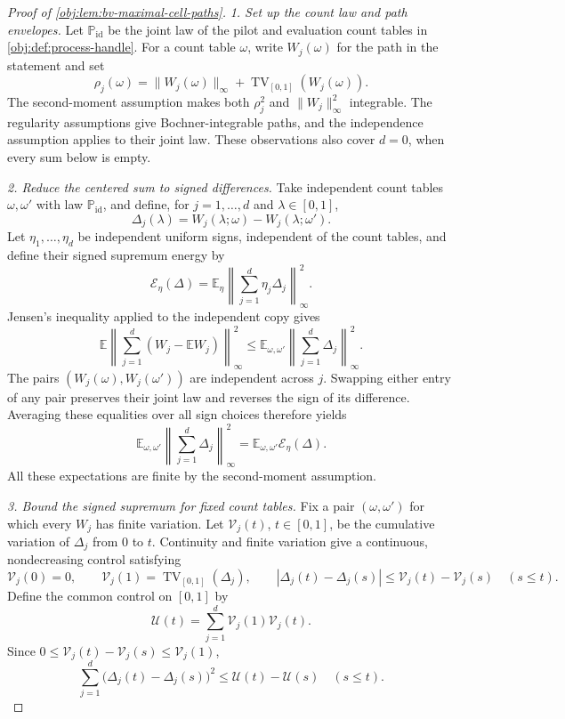 \begin{proof}[Proof of \cref{obj:lem:bv-maximal-cell-paths}]
\noindent\textit{1. Set up the count law and path envelopes.}
Let \(\mathbb P_{\mathrm{id}}\) be the joint law of the pilot and evaluation count tables in \cref{obj:def:process-handle}. For a count table \(\omega\), write \(W_j(\omega)\) for the path in the statement and set
\[
\rho_j(\omega)
=\|W_j(\omega)\|_\infty+
  \operatorname{TV}_{[0,1]}(W_j(\omega)).
\]
The second-moment assumption makes both \(\rho_j^2\) and
\(\|W_j\|_\infty^2\) integrable. The regularity assumptions give
Bochner-integrable paths, and the independence assumption applies to their
joint law. These observations also cover \(d=0\), when every sum below is
empty. %

\noindent\textit{2. Reduce the centered sum to signed differences.}
Take independent count tables \(\omega,\omega'\) with law
\(\mathbb P_{\mathrm{id}}\), and define, for \(j=1,\ldots,d\) and
\(\lambda\in[0,1]\),
\[
\Delta_j(\lambda)
=W_j(\lambda;\omega)-W_j(\lambda;\omega').
\]
Let \(\eta_1,\ldots,\eta_d\) be independent uniform signs, independent of
the count tables, and define their signed supremum energy by
\[
\mathcal E_\eta(\Delta)
=\mathbb E_\eta\left\|
  \sum_{j=1}^d\eta_j\Delta_j
 \right\|_\infty^2.
\]
Jensen's inequality applied to the independent copy gives
\[
\mathbb E\left\|
 \sum_{j=1}^d(W_j-\mathbb EW_j)
 \right\|_\infty^2
\le
\mathbb E_{\omega,\omega'}\left\|
 \sum_{j=1}^d\Delta_j
 \right\|_\infty^2.
\]
The pairs \((W_j(\omega),W_j(\omega'))\) are independent across \(j\).
Swapping either entry of any pair preserves their joint law and reverses
the sign of its difference. Averaging these equalities over all sign
choices therefore yields
\[
\mathbb E_{\omega,\omega'}\left\|
 \sum_{j=1}^d\Delta_j
 \right\|_\infty^2
=
\mathbb E_{\omega,\omega'}\mathcal E_\eta(\Delta).
\]
All these expectations are finite by the second-moment assumption.

\noindent\textit{3. Bound the signed supremum for fixed count tables.}
Fix a pair \((\omega,\omega')\) for which every \(W_j\) has finite
variation. Let \(\mathcal V_j(t)\), \(t\in[0,1]\), be the cumulative
variation of \(\Delta_j\) from \(0\) to \(t\). Continuity and finite
variation give a continuous, nondecreasing control satisfying
\[
\mathcal V_j(0)=0,\qquad
\mathcal V_j(1)=\operatorname{TV}_{[0,1]}(\Delta_j),\qquad
|\Delta_j(t)-\Delta_j(s)|
 \le \mathcal V_j(t)-\mathcal V_j(s)\quad(s\le t).
\]
Define the common control on \([0,1]\) by
\[
\mathcal U(t)=\sum_{j=1}^d
  \mathcal V_j(1)\mathcal V_j(t).
\]
Since \(0\le\mathcal V_j(t)-\mathcal V_j(s)\le\mathcal V_j(1)\),
\begin{equation}
\sum_{j=1}^d\bigl(\Delta_j(t)-\Delta_j(s)\bigr)^2
 \le \mathcal U(t)-\mathcal U(s)
 \quad(s\le t).
\label{eq:obj:bv-maximal-cell-paths-control}
\end{equation}


\end{proof}
